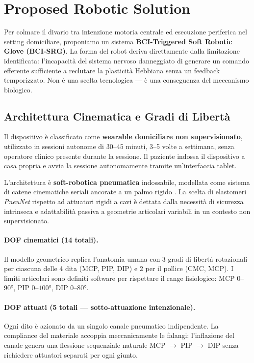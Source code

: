 \documentclass[a4paper,11pt]{article}
\begin{document}
\section{Proposed Robotic Solution}

Per colmare il divario tra intenzione motoria centrale ed esecuzione periferica
nel setting domiciliare, proponiamo un sistema \textbf{BCI-Triggered Soft Robotic
Glove (BCI-SRG)}. La forma del robot deriva direttamente dalla limitazione
identificata: l'incapacità del sistema nervoso danneggiato di generare un comando
efferente sufficiente a reclutare la plasticità Hebbiana senza un feedback
temporizzato. Non è una scelta tecnologica — è una conseguenza del meccanismo
biologico.

\subsection{Architettura Cinematica e Gradi di Libertà}

Il dispositivo è classificato come \textbf{wearable domiciliare non supervisionato},
utilizzato in sessioni autonome di 30--45 minuti, 3--5 volte a settimana, senza
operatore clinico presente durante la sessione. Il paziente indossa il dispositivo
a casa propria e avvia la sessione autonomamente tramite un'interfaccia tablet.

L'architettura è \textbf{soft-robotica pneumatica} indossabile, modellata come
sistema di catene cinematiche seriali ancorate a un palmo rigido
\cite{proietti2024combining, fiska2025integration}. La scelta di elastomeri
\textit{PneuNet} rispetto ad attuatori rigidi a cavi è dettata dalla necessità
di sicurezza intrinseca e adattabilità passiva a geometrie articolari variabili
in un contesto non supervisionato.

\paragraph{DOF cinematici (14 totali).}
Il modello geometrico replica l'anatomia umana con 3 gradi di libertà rotazionali
per ciascuna delle 4 dita (MCP, PIP, DIP) e 2 per il pollice (CMC, MCP). I limiti
articolari sono definiti software per rispettare il range fisiologico: MCP
$0$--$90°$, PIP $0$--$100°$, DIP $0$--$80°$.

\paragraph{DOF attuati (5 totali — sotto-attuazione intenzionale).}
Ogni dito è azionato da un singolo canale pneumatico indipendente. La compliance
del materiale accoppia meccanicamente le falangi: l'inflazione del canale genera
una flessione sequenziale naturale MCP $\to$ PIP $\to$ DIP senza richiedere
attuatori separati per ogni giunto.
\end{document}
